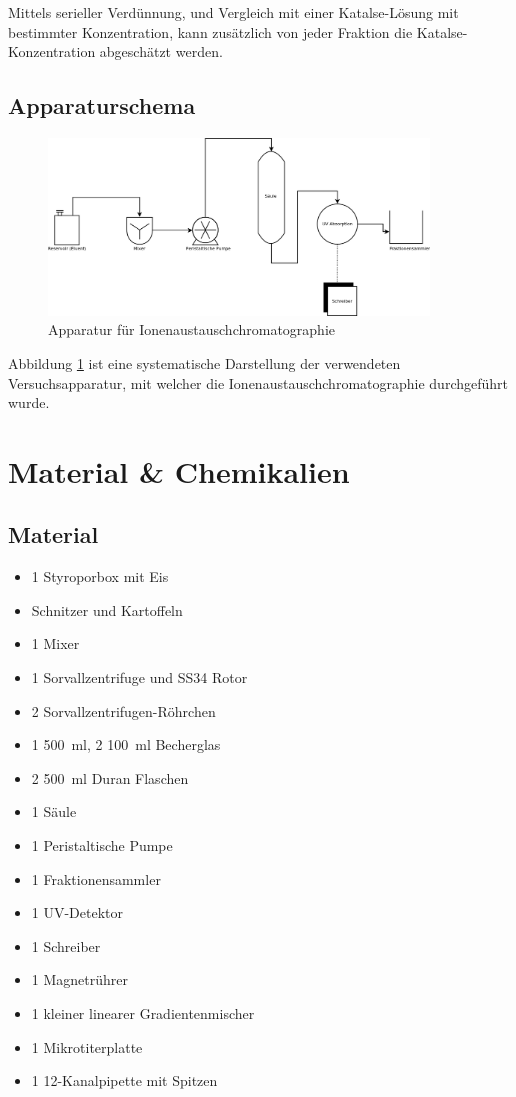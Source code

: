 \documentclass[a4paper,german]{scrreprt}
\begin{document}
Mittels serieller Verdünnung, und Vergleich mit einer Katalse-Lösung mit
bestimmter Konzentration, kann zusätzlich von jeder Fraktion die
Katalse-Konzentration abgeschätzt werden.


\section{Apparaturschema}

\begin{figure}[h]
	\centering
	\includegraphics[width=0.9\textwidth]{img/apparatur.png}
	\caption{Apparatur für Ionenaustauschchromatographie}
	\label{fig:apparatur}
\end{figure}

Abbildung \ref{fig:apparatur} ist eine systematische Darstellung der
verwendeten Versuchsapparatur, mit welcher die Ionenaustauschchromatographie
durchgeführt wurde.

\chapter{Material \& Chemikalien}

\section{Material}

\begin{itemize}
	\item 1 Styroporbox mit Eis
	\item Schnitzer und Kartoffeln
	\item 1 Mixer
	\item 1 Sorvallzentrifuge und SS34 Rotor
	\item 2 Sorvallzentrifugen-Röhrchen
	\item 1 \SI{500}{ml}, 2 \SI{100}{ml} Becherglas
	\item 2 \SI{500}{ml} Duran Flaschen
	\item 1 Säule
	\item 1 Peristaltische Pumpe
	\item 1 Fraktionensammler
	\item 1 UV-Detektor
	\item 1 Schreiber
	\item 1 Magnetrührer
	\item 1 kleiner linearer Gradientenmischer
	\item 1 Mikrotiterplatte
	\item 1 12-Kanalpipette mit Spitzen
\end{itemize}
\end{document}
